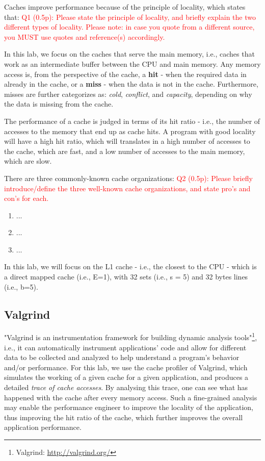 \documentclass[11pt]{article}
\newcommand \question[1]{\textcolor{red}{#1}}
\begin{document}
Caches improve performance because of the principle of locality, which states that: 
\question{Q1 (0.5p): Please state the principle of locality, and briefly explain the two different types of locality. Please note: in case you quote from a different source, you MUST use quotes and reference(s) accordingly. }

In this lab, we focus on the caches that serve the main memory, i.e., caches that work as an intermediate buffer between the CPU and main memory. Any memory access is, from the perspective of the cache, a \textbf{hit} - when the required data in already in the cache, or a \textbf{miss} - when the data is not in the cache. Furthermore, misses are further categorizes as: \textit{cold}, \textit{conflict}, and \textit{capacity}, depending on why the data is missing from the cache. 

The performance of a cache is judged in terms of its hit ratio - i.e., the number of accesses to the memory that end up as cache hits. A program with good locality will have a high hit ratio, which will translates in a high number of accesses to the cache, which are fast, and a low number of accesses to the main memory, which are slow.   

There are three commonly-known cache organizations:
\question{Q2 (0.5p): Please briefly introduce/define the three well-known cache organizations, and state pro's and con's for each.}
\begin{enumerate}
\item ... 
\item ... 
\item ... 
\end{enumerate}

In this lab, we will focus on the L1 cache - i.e., the closest to the CPU - which is a direct mapped cache (i.e., E=1), with 32 sets (i.e., s = 5) and 32 bytes lines (i.e., b=5).  

\subsection*{Valgrind}
"Valgrind is an instrumentation framework for building dynamic analysis tools"\footnote{Valgrind: \url {http://valgrind.org/}}, i.e., it can automatically  instrument applications' code and allow for different data to be collected and analyzed to help understand a program's behavior and/or performance. For this lab, we use the cache profiler of Valgrind, which simulates the working of a given cache for a given application, and produces a detailed \textit{trace of cache accesses}. By analysing this trace, one can see what has happened with the cache after every memory access. Such a fine-grained analysis may enable the performance engineer to improve the locality of the application, thus improving the hit ratio of the cache, which further improves the overall application performance.  
\end{document}
